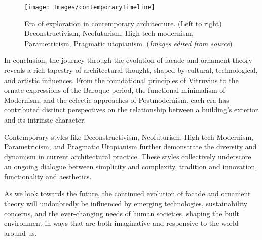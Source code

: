 \begin{figure*}[htb]
\centering
\texttt{[image: Images/contemporaryTimeline]}
\caption{Era of exploration in contemporary architecture. (Left to right) Deconstructivism, Neofuturism, High-tech modernism, Parametricism, Pragmatic utopianism. (\textit{Images edited from source})}
\label{fig:contemporarytimeline}
\end{figure*}

In conclusion, the journey through the evolution of facade and ornament theory reveals a rich tapestry of architectural thought, shaped by cultural, technological, and artistic influences.
From the foundational principles of Vitruvius to the ornate expressions of the Baroque period, the functional minimalism of Modernism, and the eclectic approaches of Postmodernism, each era has contributed distinct perspectives on the relationship between a building's exterior and its intrinsic character.

Contemporary styles like Deconstructivism, Neofuturism, High-tech Modernism, Parametricism, and Pragmatic Utopianism further demonstrate the diversity and dynamism in current architectural practice.
These styles collectively underscore an ongoing dialogue between simplicity and complexity, tradition and innovation, functionality and aesthetics.

As we look towards the future, the continued evolution of facade and ornament theory will undoubtedly be influenced by emerging technologies, sustainability concerns, and the ever-changing needs of human societies, shaping the built environment in ways that are both imaginative and responsive to the world around us.


